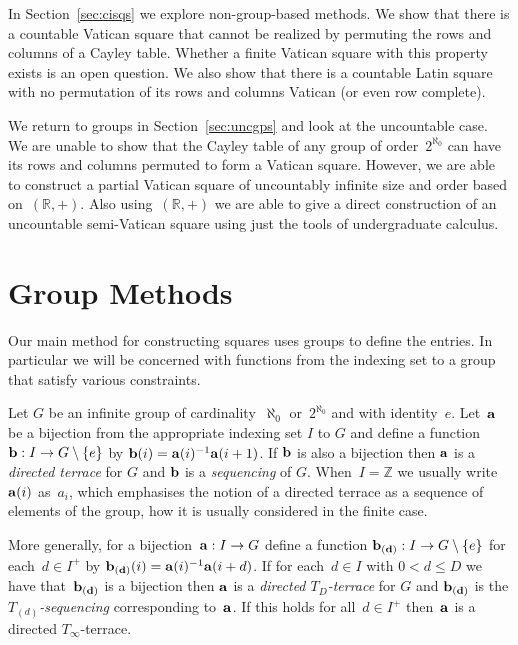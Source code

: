 \documentclass[12pt,a4paper]{article}
\newcommand{\Z}{\mathbb{Z}}
\newcommand{\R}{\mathbb{R}}
\begin{document}
In Section~\ref{sec:cisqs} we explore non-group-based methods.  We show that there is a countable Vatican square that cannot be realized by permuting the rows and columns of a Cayley table.  Whether a finite Vatican square with this property exists is an open question.  We also show that there is a countable Latin square with no permutation of its rows and columns Vatican (or even row complete).

We return to groups in Section~\ref{sec:uncgps} and look at the uncountable case.  We are unable to show that the Cayley table of any group of order~$2^{\aleph_0}$ can have its rows and columns permuted to form a Vatican square.
However, we are able to construct a partial Vatican square of uncountably infinite size and order based on~$(\R,+)$.  Also using~$(\R,+)$ we are able to give a direct construction of an uncountable semi-Vatican square using just the tools of undergraduate calculus. 





\section{Group Methods}\label{sec:gps}


Our main method for constructing squares uses groups to define the entries.  In particular we will be concerned with functions from the indexing set to a group that satisfy various constraints.

Let $G$ be an infinite group of cardinality~$\aleph_0$ or~$2^{\aleph_0}$ and with identity~$e$.  Let~${\bf a}$ be a bijection from the appropriate indexing set $I$ to $G$ and define a function ${\bf b}: I \rightarrow G\setminus\{e\}$ by ${\bf b}(i) = {\bf a}(i)^{-1}{\bf a}(i+1)$.  If ${\bf b}$ is  also a bijection then ${\bf a}$ is a {\em directed terrace} for $G$ and ${\bf b}$ is a {\em sequencing} of $G$.   When~$I = \Z$ we usually write ${\bf a}(i)$ as~$a_i$, which emphasises the notion of a directed terrace as a sequence of elements of the group, how it is usually considered in the finite case.  

More generally, for a bijection~${\bf a}: I \rightarrow G$ define a function  ${\bf b_{(d)}}: I \rightarrow G\setminus\{e\}$ for each~$d \in I^+$ by ${\bf b_{(d)}}(i) = {\bf a}(i)^{-1}{\bf a}(i+d)$.  If for each~$d \in I$ with $0 < d \leq D$ we have that~${\bf b_{(d)}}$ is a bijection then ${\bf a}$ is a {\em directed $T_{D}$-terrace} for $G$ and ${\bf b_{(d)}}$ is the {\em $T_{(d)}$-sequencing} corresponding to~${\bf a}$.  If this holds for all~$d \in I^+$ then~${\bf a}$ is a directed $T_{\infty}$-terrace.
\end{document}

